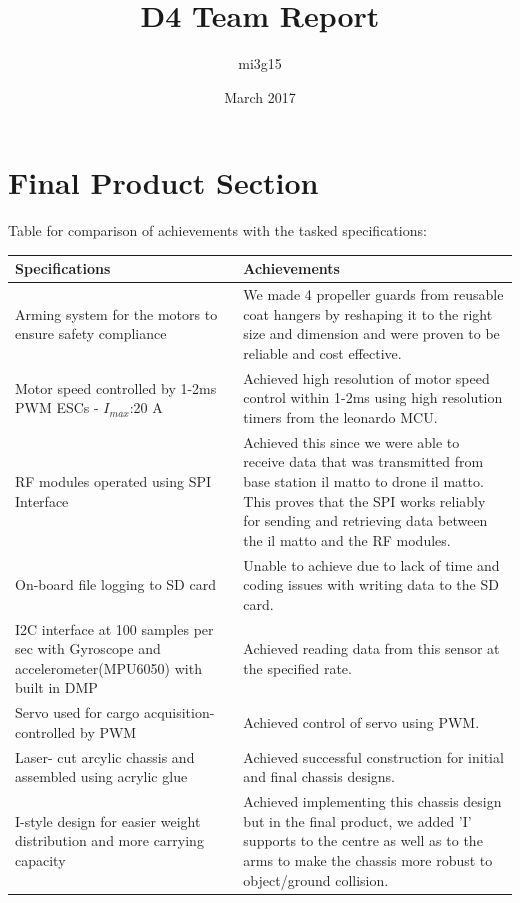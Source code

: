 \documentclass{article}
\title{D4 Team Report}
\author{mi3g15 }
\date{March 2017}
\begin{document}
\maketitle

\section{Final Product Section}
Table for comparison of achievements with the tasked specifications:
\begin{center}
    \begin{tabular}{|m{5cm}|m{8cm}|}
    \hline
     Specifications & Achievements \\
     \hline
     Arming system for the motors to ensure safety compliance &  We made 4 propeller guards from reusable coat hangers by reshaping it to the right size and dimension and were proven to be reliable and cost effective.\\
    \hline
    Motor speed controlled by 1-2ms PWM ESCs - $I_{max}$:20 A & Achieved high resolution of motor speed control within 1-2ms using high resolution timers from the leonardo MCU.\\
    \hline
    RF modules operated using SPI Interface & %
    Achieved this since we were able to receive data that was transmitted from base station il matto to drone il matto. This proves that the SPI works reliably for sending and retrieving data between the il matto and the RF modules.\\
    \hline
    On-board file logging to SD card & Unable to achieve due to lack of time and coding issues with writing data to the SD card. \\
    \hline
    I2C interface at 100 samples per sec with Gyroscope and accelerometer(MPU6050) with built in DMP & Achieved reading data from this sensor at the specified rate.  \\
    \hline
    Servo used for cargo acquisition- controlled by PWM & Achieved control of servo using PWM. \\
    \hline
    Laser- cut arcylic chassis and assembled using acrylic glue & Achieved successful construction for initial and final chassis designs. \\
    \hline 
    I-style design for easier weight distribution and more carrying capacity & Achieved implementing this chassis design but in the final product, we added 'I' supports to the centre as well as to the arms to make the chassis more robust to object/ground collision. \\

\end{tabular}
\end{center}
\end{document}
